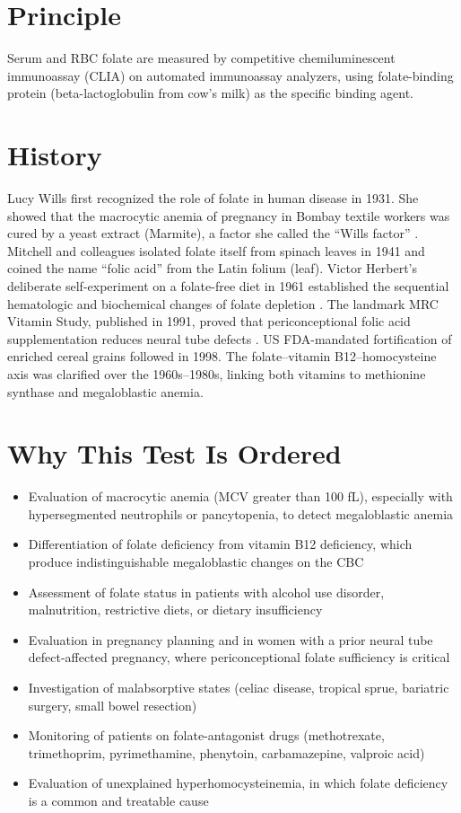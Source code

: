\section*{Principle}
Serum and RBC folate are measured by competitive chemiluminescent immunoassay (CLIA) on automated immunoassay analyzers, using folate-binding protein (beta-lactoglobulin from cow's milk) as the specific binding agent.
\section*{History}
Lucy Wills first recognized the role of folate in human disease in 1931. She showed that the macrocytic anemia of pregnancy in Bombay textile workers was cured by a yeast extract (Marmite), a factor she called the ``Wills factor'' \cite{wills1931treatment}. Mitchell and colleagues isolated folate itself from spinach leaves in 1941 and coined the name ``folic acid'' from the Latin folium (leaf). Victor Herbert's deliberate self-experiment on a folate-free diet in 1961 established the sequential hematologic and biochemical changes of folate depletion \cite{herbert1962experimental}. The landmark MRC Vitamin Study, published in 1991, proved that periconceptional folic acid supplementation reduces neural tube defects \cite{mrc1991prevention}. US FDA-mandated fortification of enriched cereal grains followed in 1998. The folate--vitamin B12--homocysteine axis was clarified over the 1960s--1980s, linking both vitamins to methionine synthase and megaloblastic anemia.
\section*{Why This Test Is Ordered}
\begin{itemize}
  \item Evaluation of macrocytic anemia (MCV greater than 100 fL), especially with hypersegmented neutrophils or pancytopenia, to detect megaloblastic anemia
  \item Differentiation of folate deficiency from vitamin B12 deficiency, which produce indistinguishable megaloblastic changes on the CBC
  \item Assessment of folate status in patients with alcohol use disorder, malnutrition, restrictive diets, or dietary insufficiency \cite{debenois2008conclusions}
  \item Evaluation in pregnancy planning and in women with a prior neural tube defect-affected pregnancy, where periconceptional folate sufficiency is critical \cite{berry1999prevention}
  \item Investigation of malabsorptive states (celiac disease, tropical sprue, bariatric surgery, small bowel resection)
  \item Monitoring of patients on folate-antagonist drugs (methotrexate, trimethoprim, pyrimethamine, phenytoin, carbamazepine, valproic acid)
  \item Evaluation of unexplained hyperhomocysteinemia, in which folate deficiency is a common and treatable cause
\end{itemize}
